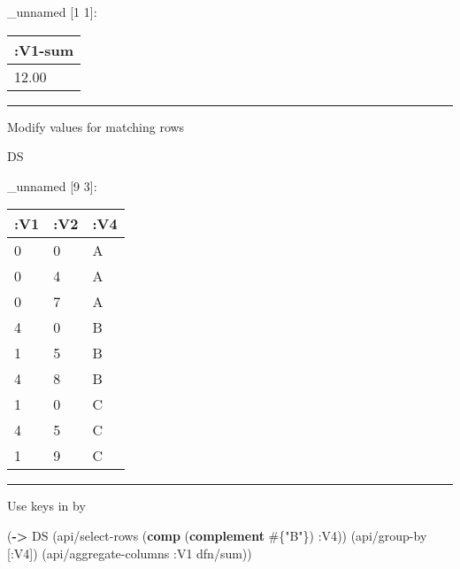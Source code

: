 \documentclass[]{article}
\newenvironment{Shaded}{\begin{snugshade}}{\end{snugshade}}
\newcommand{\KeywordTok}[1]{\textcolor[rgb]{0.13,0.29,0.53}{\textbf{#1}}}
\newcommand{\DecValTok}[1]{\textcolor[rgb]{0.00,0.00,0.81}{#1}}
\newcommand{\StringTok}[1]{\textcolor[rgb]{0.31,0.60,0.02}{#1}}
\newcommand{\FunctionTok}[1]{\textcolor[rgb]{0.00,0.00,0.00}{#1}}
\newcommand{\VariableTok}[1]{\textcolor[rgb]{0.00,0.00,0.00}{#1}}
\newcommand{\BuiltInTok}[1]{#1}
\newcommand{\AttributeTok}[1]{\textcolor[rgb]{0.77,0.63,0.00}{#1}}
\newcommand{\NormalTok}[1]{#1}
\begin{document}
\_unnamed {[}1 1{]}:

\begin{longtable}[]{@{}l@{}}
\toprule
:V1-sum\tabularnewline
\midrule
\endhead
12.00\tabularnewline
\bottomrule
\end{longtable}

\begin{center}\rule{0.5\linewidth}{0.5pt}\end{center}

Modify values for matching rows

\begin{Shaded}
\end{Shaded}

\begin{Shaded}
\begin{Highlighting}[]
\NormalTok{DS}
\end{Highlighting}
\end{Shaded}

\_unnamed {[}9 3{]}:

\begin{longtable}[]{@{}lll@{}}
\toprule
:V1 & :V2 & :V4\tabularnewline
\midrule
\endhead
0 & 0 & A\tabularnewline
0 & 4 & A\tabularnewline
0 & 7 & A\tabularnewline
4 & 0 & B\tabularnewline
1 & 5 & B\tabularnewline
4 & 8 & B\tabularnewline
1 & 0 & C\tabularnewline
4 & 5 & C\tabularnewline
1 & 9 & C\tabularnewline
\bottomrule
\end{longtable}

\begin{center}\rule{0.5\linewidth}{0.5pt}\end{center}

Use keys in by

\begin{Shaded}
\begin{Highlighting}[]
\NormalTok{(}\KeywordTok{->}\NormalTok{ DS}
\NormalTok{    (api/select-rows (}\KeywordTok{comp}\NormalTok{ (}\KeywordTok{complement}\NormalTok{ #\{}\StringTok{"B"}\NormalTok{\}) }\AttributeTok{:V4}\NormalTok{))}
\NormalTok{    (api/group-by [}\AttributeTok{:V4}\NormalTok{])}
\NormalTok{    (api/aggregate-columns }\AttributeTok{:V1}\NormalTok{ dfn/sum))}
\end{Highlighting}
\end{Shaded}
\end{document}
